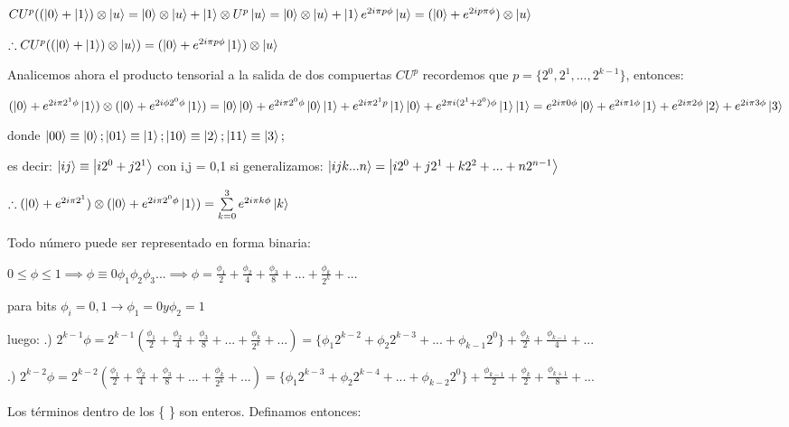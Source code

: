 $CU^p ((\ket{0} + \ket{1}) \otimes \ket{u} = \ket{0} \otimes \ket{u} + \ket{1} \otimes U^p \ket{u} = \ket{0} \otimes \ket{u} + \ket{1} e^{2i \pi p \phi} \ket{u} = (\ket{0} + e^{2 i p \pi \phi}) \otimes \ket{u}$

$\therefore CU^p ((\ket{0} + \ket{1}) \otimes \ket{u}) = (\ket{0} + e^{2 i \pi p \phi} \ket{1}) \otimes \ket{u}$

Analicemos ahora el producto tensorial a la salida de dos compuertas $CU^p$ recordemos que $p = \{2^0, 2^1, ..., 2^{k-1}\}$, entonces:

$(\ket{0} + e^{2 i \pi 2^1 \phi} \ket{1}) \otimes (\ket{0} + e^{2 i \phi 2^0 \phi} \ket{1}) = \ket{0} \ket{0} + e^{2 i \pi 2^0 \phi} \ket{0} \ket{1} + e^{2 i \pi 2^1 p} \ket{1} \ket{0} + e^{2 \pi i (2^1 + 2^0) \phi} \ket{1} \ket{1} = e^{2 i \pi 0 \phi} \ket{0} + e^{2 i \pi 1 \phi} \ket{1} + e^{2 i \pi 2 \phi} \ket{2} + e^{2 i \pi 3 \phi} \ket{3}$

donde $\ket{00} \equiv \ket{0}; \ket{01} \equiv \ket{1}; \ket{10} \equiv \ket{2}; \ket{11} \equiv \ket{3};$

es decir: $\ket{ij} \equiv \ket{i 2^0 + j 2^1}$ con i,j = 0,1
si generalizamos: $\ket{i j k ... n} = \ket{i 2^0 + j 2^1 + k 2^2 + ... + n 2^{n-1}}$

$\therefore (\ket{0} + e^{2 i \pi 2^1}) \otimes (\ket{0} + e^{2 i \pi 2^0 \phi} \ket{1}) = \sum\limits_{k = 0}^3 e^{2i \pi k \phi} \ket{k}$

Todo número puede ser representado en forma binaria:

$0 \leq \phi \leq 1 \implies \phi \equiv 0 \phi_1 \phi_2 \phi_3 ... \implies \phi = \frac{\phi_1}{2} + \frac{\phi_2}{4} + \frac{\phi_3}{8} + ... + \frac{\phi_k}{2^k} + ...$

para bits $\phi_i = 0,1 \rightarrow \phi_1 = 0 y \phi_2 = 1$

luego: .) $2^{k-1} \phi = 2^{k-1} ( \frac{\phi_1}{2} + \frac{\phi_2}{4} + \frac{\phi_3}{8} + ... + \frac{\phi_k}{2^k} + ...) = \{\phi_1 2^{k-2} + \phi_2 2^{k-3} + ... + \phi_{k-1} 2^0\} + \frac{\phi_k}{2} + \frac{\phi_{k-1}}{4} + ...$

.) $2^{k-2} \phi = 2^{k-2} ( \frac{\phi_1}{2} + \frac{\phi_2}{4} + \frac{\phi_3}{8} + ... + \frac{\phi_k}{2^k} + ...) = \{\phi_1 2^{k-3} + \phi_2 2^{k-4} + ... + \phi_{k-2} 2^0\} + \frac{\phi_{k-1}}{2} + \frac{\phi_k}{2} + \frac{\phi_{k+1}}{8} + ...$

Los términos dentro de los \{ \} son enteros. Definamos entonces:

